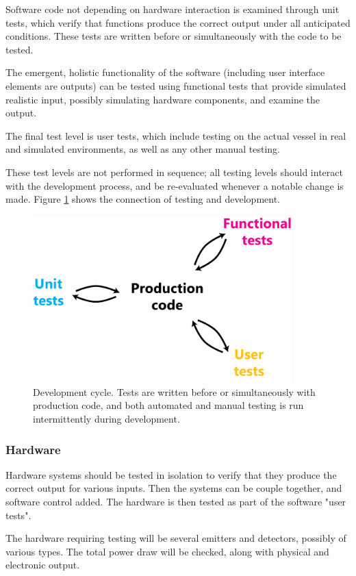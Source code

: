 Software code not depending on hardware interaction is examined through unit tests, which verify that functions produce the correct output under all anticipated conditions. These tests are written before or simultaneously with the code to be tested.

The emergent, holistic functionality of the software (including user interface elements are outputs) can be tested using functional tests that provide simulated realistic input, possibly simulating hardware components, and examine the output.

The final test level is user tests, which include testing on the actual vessel in real and simulated environments, as well as any other manual testing.

These test levels are not performed in sequence; all testing levels should interact with the development process, and be re-evaluated whenever a notable change is made. Figure \ref{fig:software-testing} shows the connection of testing and development.

\begin{figure}
\includegraphics[width=100mm,natwidth=494,natheight=299]{"./image/software-testing"}
\caption[Software development cycle]{\label{fig:software-testing}Development cycle. Tests are written before or simultaneously with production code, and both automated and manual testing is run intermittently during development.}
\end{figure}

\subsubsection{\label{sec:method:proposed-verification-procedure:hardware}Hardware}
Hardware systems should be tested in isolation to verify that they produce the correct output for various inputs. Then the systems can be couple together, and software control added. The hardware is then tested as part of the software "user tests".

The hardware requiring testing will be several emitters and detectors, possibly of various types. The total power draw will be checked, along with physical and electronic output.
